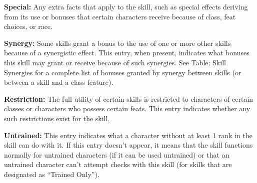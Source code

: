 \textbf{Special:} Any extra facts that apply to the skill, such as special effects deriving from its use or bonuses that certain characters receive because of class, feat choices, or race.

\textbf{Synergy:} Some skills grant a bonus to the use of one or more other skills because of a synergistic effect. This entry, when present, indicates what bonuses this skill may grant or receive because of such synergies. See Table: Skill Synergies for a complete list of bonuses granted by synergy between skills (or between a skill and a class feature).

\textbf{Restriction:} The full utility of certain skills is restricted to characters of certain classes or characters who possess certain feats. This entry indicates whether any such restrictions exist for the skill.

\textbf{Untrained:} This entry indicates what a character without at least 1 rank in the skill can do with it. If this entry doesn’t appear, it means that the skill functions normally for untrained characters (if it can be used untrained) or that an untrained character can’t attempt checks with this skill (for skills that are designated as ``Trained Only'').









